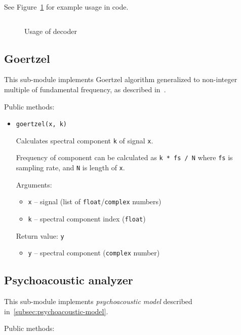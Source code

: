 See Figure~\ref{fig:decoder-example} for example usage in code.

\begin{figure}[p]
\centering
\inputminted[linenos]{python}{listings/decoder_example.py}
\caption{Usage of decoder}
\label{fig:decoder-example}
\end{figure}

\subsection{Goertzel}

This sub-module implements Goertzel algorithm generalized to non-integer multiple of fundamental frequency, as described in~\cite{PS12}.

Public methods:
\begin{itemize}
\item \verb|goertzel(x, k)|

  Calculates spectral component \verb|k| of signal \verb|x|.

  Frequency of component can be calculated as \verb|k * fs / N| where \verb|fs| is sampling rate, and \verb|N| is length of \verb|x|.

  Arguments:
  \begin{itemize}
  \item \verb|x| -- signal (list of \verb|float|/\verb|complex| numbers)
  \item \verb|k| -- spectral component index (\verb|float|)
  \end{itemize}

  Return value: \verb|y|
  \begin{itemize}
  \item \verb|y| -- spectral component (\verb|complex| number)
  \end{itemize}
\end{itemize}

\subsection{Psychoacoustic analyzer}

This sub-module implements \emph{psychoacoustic model} described in~\ref{subsec:psychoacoustic-model}.

Public methods:

